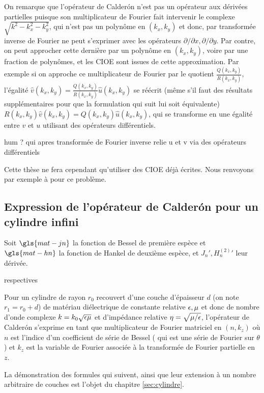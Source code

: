     On remarque que l'opérateur de Calderón n'est pas un opérateur aux dérivées partielles puisque son multiplicateur de Fourier fait intervenir le complexe \(\sqrt{k^2-k_x^2 - k_y^2}\), qui n'est pas un polynôme en $(k_x,k_y)$ et donc, par transformée inverse de Fourier ne peut s'exprimer avec les opérateurs \(\partial/\partial x, \partial / \partial y\).
    Par contre, on peut approcher cette dernière par un polynôme en \((k_x,k_y)\), voire par une fraction de polynômes, et les CIOE sont issues de cette approximation.
    Par exemple si on approche ce multiplicateur de Fourier par le quotient \(\frac{Q(k_x,k_y)}{R(k_x,k_y)}\), l'égalité \({\hat v}(k_x,k_y)=\frac{Q(k_x,k_y)}{R(k_x,k_y)}{\hat u}(k_x,k_y)\) se réécrit (même s'il faut des résultats supplémentaires pour que la formulation qui suit lui soit équivalente) \(R(k_x,k_y){\hat v}(k_x,k_y)=Q(k_x,k_y){\hat u}(k_x,k_y)\), qui se transforme en une égalité entre $v$ et $u$ utilisant des opérateurs différentiels.
    \begin{REM}
  hum ? qui apres transformée de Fourier inverse relie u et v via des opérateurs différentiels
\end{REM}
    Cette thèse ne fera cependant qu'utiliser des CIOE déjà écrites.
    Nous renvoyons par exemple à \cite{senior_approximate_1995} pour ce problème.

  \subsection{Expression de l'opérateur de Calderón pour un cylindre infini}

    Soit \(\gls{mat-jn}\) la fonction de Bessel de première espèce et \(\gls{mat-hn}\) la fonction de Hankel de deuxième espèce, et \(J_n', H_n^{(2)}{}'\) leur dérivée.
    \begin{REM}
  respectives
\end{REM}

    Pour un cylindre de rayon \(r_0\) recouvert d'une couche d'épaisseur \(d\) (on note \(r_1=r_0 + d\)) de matériau diélectrique de constante relative \(\epsilon,\mu\) et donc de nombre d'onde complexe \(k = k_0\sqrt{\epsilon\mu}\) et d'impédance relative \(\eta=\sqrt{{\mu}/{\epsilon}}\), l'opérateur de Calderón s'exprime en tant que multiplicateur de Fourier matriciel en \((n,k_z)\) où \(n\) est l'indice d'un coefficient de série de Bessel ( qui est une série de Fourier sur \(\theta\) ) et \(k_z\) est la variable de Fourier associée à la transformée de Fourier partielle en \(z\).

    La démonstration des formules qui suivent, ainsi que leur extension à un nombre arbitraire de couches est l'objet du chapitre \ref{sec:cylindre}.

